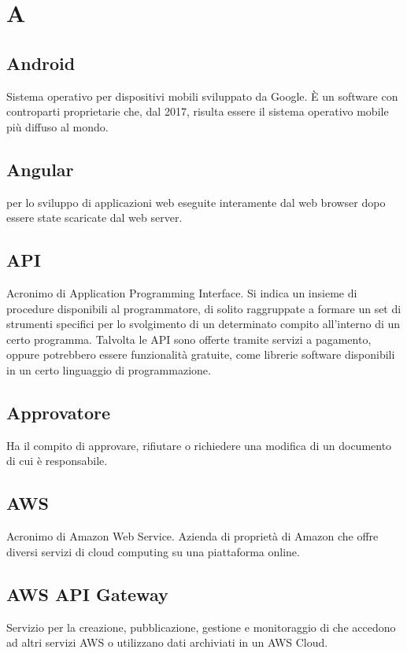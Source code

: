 \section*{A}
\markright{}

\subsection*{Android}
Sistema operativo per dispositivi mobili sviluppato da Google. È un software  con controparti proprietarie che, dal 2017, risulta essere il sistema operativo mobile più diffuso al mondo. 
 
\subsection*{Angular}
  per lo sviluppo di applicazioni web eseguite interamente dal web browser dopo essere state scaricate dal web server.

\subsection*{API}
Acronimo di Application Programming Interface. Si indica un  insieme  di  procedure disponibili al programmatore, di solito  raggruppate a formare un set di strumenti specifici per lo svolgimento di un determinato compito all'interno di un certo programma. Talvolta le API sono offerte tramite servizi a pagamento, oppure potrebbero essere funzionalità gratuite, come librerie software disponibili in un certo linguaggio di programmazione.

\subsection*{Approvatore}
Ha il compito di approvare, rifiutare o richiedere una modifica di un documento di cui è responsabile.

\subsection*{AWS}
Acronimo di Amazon Web Service. Azienda di proprietà di Amazon che offre diversi servizi di cloud computing su una piattaforma online.

\subsection*{AWS API Gateway}
Servizio  per la creazione, pubblicazione, gestione e monitoraggio di  che accedono ad altri servizi AWS o utilizzano dati archiviati in un AWS Cloud.

